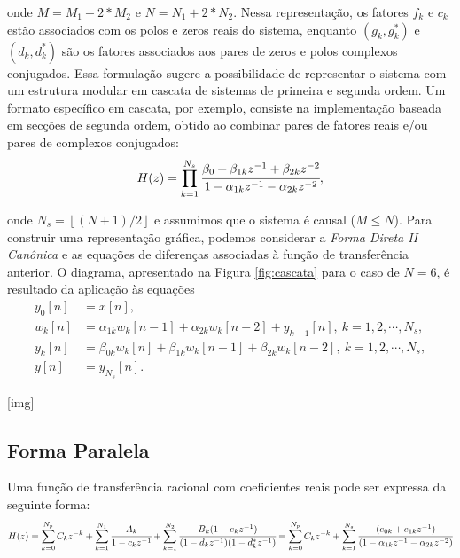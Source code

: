 \documentclass[11pt]{article}
\begin{document}
\noindent onde $M = M_1 + 2*M_2$ e $N = N_1 + 2*N_2$. Nessa representação, os fatores $f_k$ e $c_k$ estão associados com os polos e zeros reais do sistema, enquanto $(g_k, g^*_k)$ e $(d_k, d^*_k)$ são os fatores associados aos pares de zeros e polos complexos conjugados. Essa formulação sugere a possibilidade de representar o sistema com um estrutura modular em cascata de sistemas de primeira e segunda ordem. Um formato específico em cascata, por exemplo, consiste na implementação baseada em secções de segunda ordem, obtido ao combinar pares de fatores reais e/ou pares de complexos conjugados:
\begin{equation}
\begin{matrix}
	H(z) = \displaystyle\prod_{k=1}^{N_s} \cfrac{\beta_0 + \beta_{1k} z^{-1} + \beta_{2k} z^{-2}}{1 - \alpha_{1k} z^{-1} - \alpha_{2k} z^{-2}},
\end{matrix}
\end{equation}

\noindent onde $N_s = \left\lfloor (N+1) / 2 \right\rfloor$ e assumimos que o sistema é causal ($M \leq N$). Para construir uma representação gráfica, podemos considerar a \textit{Forma Direta II Canônica} e as equações de diferenças associadas à função de transferência anterior. O diagrama, apresentado na Figura \ref{fig:cascata} para o caso de $N = 6$, é resultado da aplicação às equações
\begin{align}
	y_0[n] &= x[n], \\
	w_k[n] &= \alpha_{1k} w_k[n-1] + \alpha_{2k} w_k[n-2] + y_{k-1}[n],\ k = 1, 2, \cdots, N_s, \\
	y_k[n] &= \beta_{0k} w_k[n] + \beta_{1k} w_k[n-1] + \beta_{2k} w_{k}[n-2],\ k = 1, 2, \cdots, N_s, \\
	y[n] &= y_{N_s}[n].
\end{align}

[img]

\subsection{Forma Paralela}

Uma função de transferência racional com coeficientes reais pode ser expressa da seguinte forma:
\begin{equation}
	H(z) = \sum_{k=0}^{N_p} C_k z^{-k} + \sum_{k=1}^{N_1} \cfrac{A_k}{1 - c_k z^{-1}} + \sum_{k=1}^{N_2} \cfrac{B_k(1 - e_k z^{-1})}{(1 - d_k z^{-1})(1 - d^*_k z^{-1})} = \sum_{k=0}^{N_p} C_k z^{-k} + \sum_{k=1}^{N_s} \cfrac{(e_{0k} + e_{1k} z^{-1})}{(1 - \alpha_{1k} z^{-1} - \alpha_{2k} z^{-2})}
\end{equation}
\end{document}
